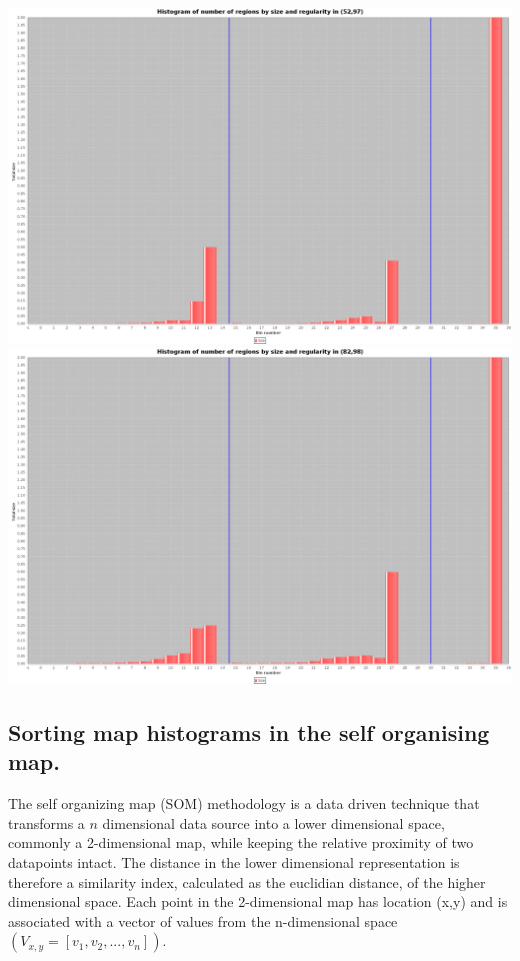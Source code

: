 \documentclass{nature}
\makeatletter
\renewenvironment*{figure}{\@float{figure}}{\end@float}
\makeatother
\begin{document}
\begin{methods}
\begin{figure}
  \includegraphics[scale=0.0235]{Images/Histograms/Hist_52_97.png}   
  \includegraphics[scale=0.0235]{Images/Histograms/Hist_82_98.png}   
\caption{\bf Samples of map regions (top) and resulting histograms (bottom). Region size, regularity, and colour counts are joined into a combined histogram vector, with size frequencies on the left side of the graph, regularity on the centre right and colour pixel counts to the far right.}    
 \label{fig:mapsandHist}  
\end{figure} 

\subsection{Sorting map histograms in the self organising map.}\label{methodscluster}
The self organizing map (SOM) methodology\cite{Kohonen1982} is a data driven technique that transforms a $n$ dimensional data source into a lower dimensional space, commonly a 2-dimensional map, while keeping the relative proximity of two datapoints intact. The distance in the lower dimensional representation is therefore a similarity index, calculated as the euclidian distance, of the higher dimensional space. Each point in the 2-dimensional map has location (x,y) and is associated with a vector of values from the n-dimensional space $(V_{x,y} = [v_{1},v_{2},...,v_{n}])$.


\end{methods}
\end{document}
